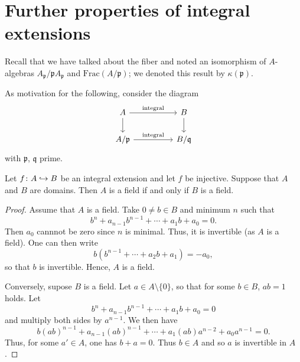 \section{Further properties of integral extensions}

Recall that we have talked about the fiber and noted an isomorphism of $A$-algebras $A_{\mathfrak p} /{ \mathfrak p A_{\mathfrak p}}$ and $\text{Frac}(A/{\mathfrak p})$; we denoted this result by $\kappa(\mathfrak p)$.


As motivation for the following, consider the diagram
\[
\begin{tikzcd}[column sep = huge]
  A \arrow{r}{\text{integral}} \arrow{d}
  & B \arrow{d} \\
  A/{\mathfrak p} \arrow{r}{\text{integral}}
  & B/{\mathfrak q}
\end{tikzcd}
\]
with $\mathfrak p$, $\mathfrak q$ prime.

\begin{lemma}
  \label{integral extensions of domains propagate fields}
  Let $f \colon A \hookrightarrow B$ be an integral extension and let $f$ be injective. Suppose that $A$ and $B$ are domains. Then $A$ is a field if and only if $B$ is a field.
\end{lemma}
\begin{proof}
  Assume that $A$ is a field. Take $0 \neq b \in B$ and minimum $n$ such that
  \[ b^n + a_{n-1} b^{n-1} + \dotsb + a_1b + a_0 = 0.\]
  Then $a_0$ cannnot be zero since $n$ is minimal. Thus, it is invertible (as $A$ is a field). One can then write
  \[ b (b^{n-1} + \dotsb + a_2b + a_1) = - a_0,\]
  so that $b$ is invertible. Hence, $A$ is a field.

  Conversely, supose $B$ is a field. Let $a \in A\setminus\{0\}$, so that for some $b \in B$, $ab=1$ holds. Let
  \[ b^n + a_{n-1}b^{n-1} + \dotsb + a_1 b + a_0 = 0\]
  and multiply both sides by $a^{n-1}$.
  We then have
  \[ b (ab)^{n-1} + a_{n-1} (ab)^{n-1} + \dotsb + a_1 (ab) a^{n-2} + a_0 a^{n-1} = 0.\]
  Thus, for some $a' \in A$, one has $b+a=0$. Thus $b \in A$ and so $a$ is invertible in $A$.
\end{proof}

